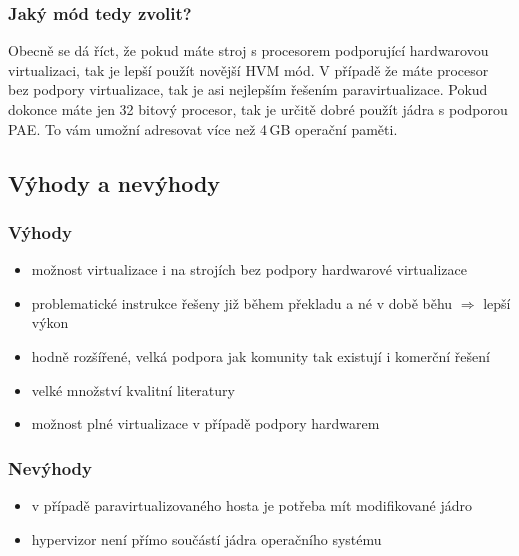 \subsubsection{Jaký mód tedy zvolit?}
Obecně se dá říct, že pokud máte stroj s procesorem podporující hardwarovou virtualizaci, tak je lepší použít novější HVM mód. V případě že máte procesor bez podpory virtualizace, tak je asi nejlepším řešením paravirtualizace. Pokud dokonce máte jen 32 bitový procesor, tak je určitě dobré použít jádra s podporou PAE. To vám umožní adresovat více než 4\,GB operační paměti.

\subsection{Výhody a nevýhody}
\subsubsection{Výhody}
\begin{itemize}
  \item možnost virtualizace i na strojích bez podpory hardwarové virtualizace
  \item problematické instrukce řešeny již během překladu a né v době běhu $\Rightarrow$ lepší výkon
  \item hodně rozšířené, velká podpora jak komunity tak existují i komerční řešení
  \item velké množství kvalitní literatury
  \item možnost plné virtualizace v případě podpory hardwarem
\end{itemize}

\subsubsection{Nevýhody}
\begin{itemize}
  \item v případě paravirtualizovaného hosta je potřeba mít modifikované jádro
  \item hypervizor není přímo součástí jádra operačního systému
\end{itemize}

